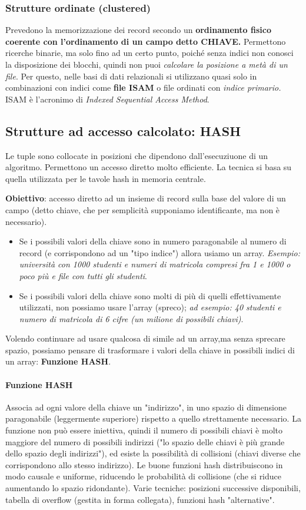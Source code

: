 \documentclass{article}
\newcounter{esempio}
\begin{document}
		\subsubsection{Strutture ordinate (clustered)}
		Prevedono la memorizzazione dei record secondo un \textbf{ordinamento fisico coerente con l'ordinamento di un campo detto CHIAVE.} Permettono ricerche binarie, ma solo fino ad un certo punto, poiché senza indici non conosci la disposizione dei blocchi, quindi non puoi \textit{calcolare la posizione a metà di un file}. Per questo, nelle basi di dati relazionali si utilizzano quasi solo in combinazioni con indici come \textbf{file ISAM} o file ordinati con \textit{indice primario.} ISAM è l'acronimo di \textit{Indexed Sequential Access Method}.

		\subsection{Strutture ad accesso calcolato: HASH}
		Le tuple sono collocate in posizioni che dipendono dall'esecuziuone di un algoritmo. Permettono un accesso diretto molto efficiente. La tecnica si basa su quella utilizzata per le tavole hash in memoria centrale.
		
		\textbf{Obiettivo}: accesso diretto ad un insieme di record sulla base del valore di un campo (detto chiave, che per semplicità supponiamo identificante, ma non è necessario). \begin{itemize}
			\item Se i possibili valori della chiave sono in numero paragonabile al numero di record (e corrispondono ad un "tipo indice") allora usiamo un array. \textit{Esempio: università con 1000 studenti e numeri di matricola compresi fra 1 e 1000 o poco più e file con tutti gli studenti}. 
			\item Se i possibili valori della chiave sono molti di più di quelli effettivamente utilizzati, non possiamo usare l'array (spreco); \textit{ad esempio: 40 studenti e numero di matricola di 6 cifre (un milione di possibili chiavi)}. 
		\end{itemize}
			
		Volendo continuare ad usare qualcosa di simile ad un array,ma senza sprecare spazio, possiamo pensare di
		trasformare i valori della chiave in possibili indici di un array: \textbf{Funzione HASH}.
		\paragraph{Funzione HASH} Associa ad ogni valore della chiave un "indirizzo", in uno spazio di
		dimensione paragonabile (leggermente superiore) rispetto a quello strettamente necessario. La funzione non può essere iniettiva, quindi il numero di possibili chiavi è molto maggiore del numero di possibili indirizzi ("lo
		spazio delle chiavi è più grande dello spazio degli indirizzi"), ed esiste la possibilità di collisioni (chiavi diverse che corrispondono allo stesso indirizzo). Le buone funzioni hash distribuiscono in modo causale e uniforme,
		riducendo le probabilità di collisione (che si riduce aumentando lo spazio ridondante).  Varie tecniche: posizioni successive disponibili, tabella di overflow (gestita in forma collegata), funzioni hash "alternative".
		
\end{document}
